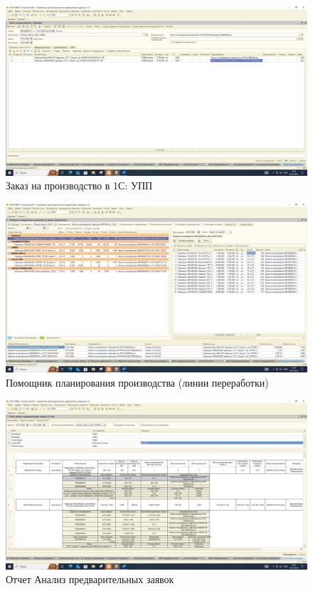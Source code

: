 \begin{figure}
\begin{center}
 \includegraphics[height=0.35\textheight, keepaspectratio]{Pics/ПЛ3.jpg}
\end{center}
 \caption{Заказ на производство в 1С: УПП}
 \label{pic:ПЛ3}
\end{figure}


\begin{figure}
\begin{center}
 \includegraphics[height=0.35\textheight, keepaspectratio]{Pics/ПЛ4.jpg}
\end{center}
 \caption{Помощник планирования производства (линии переработки)}
 \label{pic:ПЛ4}
\end{figure}

\begin{figure}
\begin{center}
 \includegraphics[height=0.35\textheight, keepaspectratio]{Pics/ПЛ5.jpg}
\end{center}
 \caption{Отчет Анализ предварительных заявок}
 \label{pic:ПЛ5}
\end{figure}

